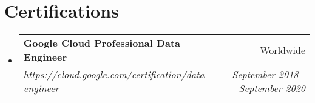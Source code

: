 \documentclass[a4paper,10.8pt]{article}
\makeatletter
\newcommand{\resumeItem}[2]{
  \item\small{
    \textbf{#1}{: #2 \vspace{-2pt}}
  }
}
\newcommand{\resumeSubheading}[4]{
  \vspace{-1pt}\item
    \begin{tabular*}{0.97\textwidth}{l@{\extracolsep{\fill}}r}
      \textbf{#1} & #2 \\
      \textit{\small#3} & \textit{\small #4} \\
    \end{tabular*}\vspace{-5pt}
}
\newcommand{\resumeSubItem}[2]{\resumeItem{#1}{#2}\vspace{-4pt}}
\newcommand{\resumeSubHeadingListStart}{\begin{itemize}[leftmargin=*]}
\newcommand{\resumeSubHeadingListEnd}{\end{itemize}}
\makeatother
\begin{document}

\section{Certifications}
\resumeSubHeadingListStart
\resumeSubheading{Google Cloud Professional Data Engineer}{Worldwide}{\href{https://cloud.google.com/certification/data-engineer}{https://cloud.google.com/certification/data-engineer}}{September 2018 - September 2020}
\resumeSubHeadingListEnd


\end{document}
